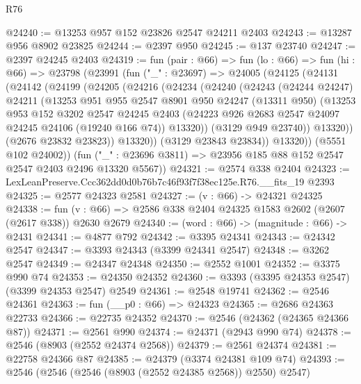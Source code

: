 \begin{lexlean}{R76}
\begin{coremodule}
@24240 := @13253 @957 @152 @23826 @2547 @24211 @2403
@24243 := @13287 @956 @8902 @23825
@24244 := @2397 @950
@24245 := @137 @23740
@24247 := @2397 @24245 @2403
@24319 := fun (pair : @66) =>
  fun (lo : @66) =>
  fun (hi : @66) =>
  @23798
    (@23991
      (fun ("_" : @23697) =>
      @24005
        (@24125
          (@24131
            (@24142
              (@24199
                (@24205
                  (@24216
                    (@24234
                      (@24240
                        (@24243
                          (@24244 @24247)
                          @24211
                          (@13253
                            @951
                            @955
                            @2547
                            @8901
                            @950
                            @24247
                            (@13311 @950)
                            (@13253
                              @953
                              @152
                              @3202
                              @2547
                              @24245
                              @2403
                              (@24223 @926 @2683 @2547 @24097 @24245 @24106 (@19240 @166 @74))
                              @13320))
                          (@3129 @949 @23740))
                        @13320))
                    (@2676 @23832 @23823))
                  @13320))
              (@3129 @23843 @23834))
            @13320))
        (@5551 @102 @24002))
      (fun ("_" : @23696 @3811) => @23956 @185 @88 @152 @2547 @2547 @2403 @2496 @13320 @5567))
@24321 := @2574 @338 @2404
@24323 := LexLeanPreserve.Ccc362dd0d0b76b7c46f93f7f38ec125e.R76.__fits_19 @2393
@24325 := @2577 @24323 @2581
@24327 := (v : @66) -> @24321 @24325
@24338 := fun (v : @66) => @2586 @338 @2404 @24325 @1583 @2602 (@2607 (@2617 @338)) @2630 @2679
@24340 := (word : @66) -> (magnitude : @66) -> @2431
@24341 := @4877 @792
@24342 := @3395 @24341
@24343 := @24342 @2547
@24347 := @3393 @24343 (@3399 @24341 @2547)
@24348 := @3262 @2547
@24349 := @24347 @24348
@24350 := @2552 @1001
@24352 := @3375 @990 @74
@24353 := @24350 @24352
@24360 := @3393 (@3395 @24353 @2547) (@3399 @24353 @2547) @2549
@24361 := @2548 @19741
@24362 := @2546 @24361
@24363 := fun (__p0 : @66) => @24323
@24365 := @2686 @24363 @22733
@24366 := @22735 @24352
@24370 := @2546 (@24362 (@24365 @24366 @87))
@24371 := @2561 @990
@24374 := @24371 (@2943 @990 @74)
@24378 := @2546 (@8903 (@2552 @24374 @2568))
@24379 := @2561 @24374
@24381 := @22758 @24366 @87
@24385 := @24379 (@3374 @24381 @109 @74)
@24393 := @2546 (@2546 (@2546 (@8903 (@2552 @24385 @2568)) @2550) @2547)

\end{coremodule}
\end{lexlean}
